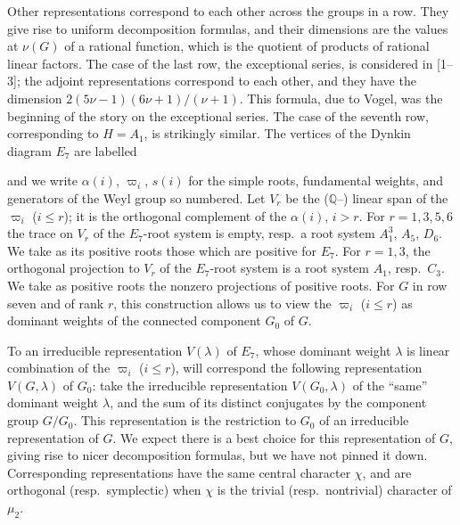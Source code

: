 \documentclass[11pt,a4paper]{article}
\begin{document}
Other representations correspond to each other across the groups in a row. They give rise to uniform decomposition formulas, and their dimensions are the values at $\nu(G)$ of a rational function, which is the quotient of products of rational linear factors. The case of the last row, the exceptional series, is considered in [1--3]; the adjoint representations correspond to each other, and they have the dimension $2(5\nu - 1)(6\nu + 1)/(\nu + 1)$. This formula, due to Vogel, was the beginning of the story on the exceptional series. The case of the seventh row, corresponding to $H = A_{1}$, is strikingly similar. The vertices of the Dynkin diagram $E_{7}$ are labelled
\begin{center}
\end{center}
and we write $\alpha(i)$, $\varpi_{i}$, $s(i)$ for the simple roots, fundamental weights, and generators of the Weyl group so numbered. Let $V_{r}$ be the ($\mathbb{Q}$--) linear span of the $\varpi_{i}$ ($i \leqslant r$); it is the orthogonal complement of the $\alpha(i)$, $i > r$. For $r = 1, 3, 5, 6$ the trace on $V_{r}$ of the $E_{7}$-root system is empty, resp.~a root system $A_{1}^{3}$, $A_{5}$, $D_{6}$. We take as its positive roots those which are positive for $E_{7}$. For $r = 1, 3$, the orthogonal projection to $V_{r}$ of the $E_{7}$-root system is a root system $A_{1}$, resp.~$C_{3}$. We take as positive roots the nonzero projections of positive roots. For $G$ in row seven and of rank $r$, this construction allows us to view the $\varpi_{i}$ ($i \leqslant r$) as dominant weights of the connected component $G_{0}$ of $G$.

To an irreducible representation $V(\lambda)$ of $E_{7}$, whose dominant weight $\lambda$ is linear combination of the $\varpi_{i}$ ($i \leqslant r$), will correspond the following representation $V(G, \lambda)$ of $G_{0}$: take the irreducible representation $V(G_{0}, \lambda)$ of the ``same'' dominant weight $\lambda$, and the sum of its distinct conjugates by the component group $G/G_{0}$. This representation is the restriction to $G_{0}$ of an irreducible representation of $G$. We expect there is a best choice for this representation of $G$, giving rise to nicer decomposition formulas, but we have not pinned it down. Corresponding representations have the same central character $\chi$, and are orthogonal (resp.~symplectic) when $\chi$ is the trivial (resp.~nontrivial) character of $\mu_{2}$.
\end{document}
